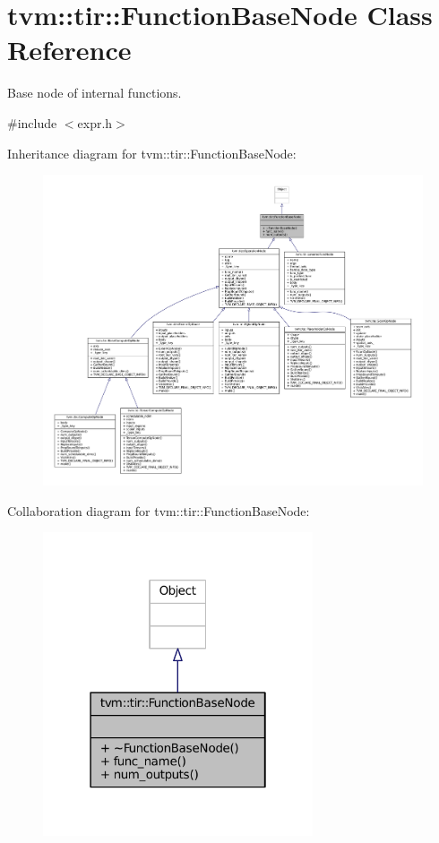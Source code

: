 \hypertarget{classtvm_1_1tir_1_1FunctionBaseNode}{}\section{tvm\+:\+:tir\+:\+:Function\+Base\+Node Class Reference}
\label{classtvm_1_1tir_1_1FunctionBaseNode}


Base node of internal functions.  




{\ttfamily \#include $<$expr.\+h$>$}



Inheritance diagram for tvm\+:\+:tir\+:\+:Function\+Base\+Node\+:
\nopagebreak
\begin{figure}[H]
\begin{center}
\leavevmode
\includegraphics[width=350pt]{classtvm_1_1tir_1_1FunctionBaseNode__inherit__graph}
\end{center}
\end{figure}


Collaboration diagram for tvm\+:\+:tir\+:\+:Function\+Base\+Node\+:
\nopagebreak
\begin{figure}[H]
\begin{center}
\leavevmode
\includegraphics[width=226pt]{classtvm_1_1tir_1_1FunctionBaseNode__coll__graph}
\end{center}
\end{figure}
